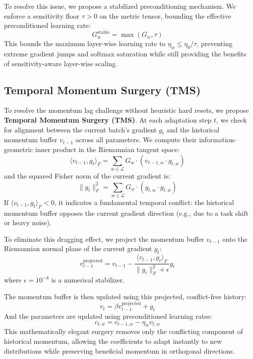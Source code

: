 \documentclass{article}
\theoremstyle{plain}
\theoremstyle{definition}
\theoremstyle{remark}
\begin{document}
To resolve this issue, we propose a stabilized preconditioning mechanism. We enforce a sensitivity floor $\tau > 0$ on the metric tensor, bounding the effective preconditioned learning rate:
\begin{equation}
    G_w^{\text{stable}} = \max(G_w, \tau)
\end{equation}
This bounds the maximum layer-wise learning rate to $\eta_w \leq \eta_0 / \tau$, preventing extreme gradient jumps and softmax saturation while still providing the benefits of sensitivity-aware layer-wise scaling.

\subsection{Temporal Momentum Surgery (TMS)}
To resolve the momentum lag challenge without heuristic hard resets, we propose \textbf{Temporal Momentum Surgery (TMS)}. At each adaptation step $t$, we check for alignment between the current batch's gradient $g_t$ and the historical momentum buffer $v_{t-1}$ across all parameters.
We compute their information-geometric inner product in the Riemannian tangent space:
\begin{equation}
    \langle v_{t-1}, g_t \rangle_F = \sum_{w \in \mathcal{L}} G_w \cdot (v_{t-1, w} \cdot g_{t, w})
\end{equation}
and the squared Fisher norm of the current gradient is:
\begin{equation}
    \|g_t\|_F^2 = \sum_{w \in \mathcal{L}} G_w \cdot (g_{t, w} \cdot g_{t, w})
\end{equation}
If $\langle v_{t-1}, g_t \rangle_F < 0$, it indicates a fundamental temporal conflict: the historical momentum buffer opposes the current gradient direction (e.g., due to a task shift or heavy noise).

To eliminate this dragging effect, we project the momentum buffer $v_{t-1}$ onto the Riemannian normal plane of the current gradient $g_t$:
\begin{equation}
    v_{t-1}^{\text{projected}} = v_{t-1} - \frac{\langle v_{t-1}, g_t \rangle_F}{\|g_t\|_F^2 + \epsilon} g_t
\end{equation}
where $\epsilon = 10^{-8}$ is a numerical stabilizer.

The momentum buffer is then updated using this projected, conflict-free history:
\begin{equation}
    v_t = \beta v_{t-1}^{\text{projected}} + g_t
\end{equation}
And the parameters are updated using preconditioned learning rates:
\begin{equation}
    c_{t, w} = c_{t-1, w} - \eta_w v_{t, w}
\end{equation}
This mathematically elegant surgery removes only the conflicting component of historical momentum, allowing the coefficients to adapt instantly to new distributions while preserving beneficial momentum in orthogonal directions.
\end{document}
